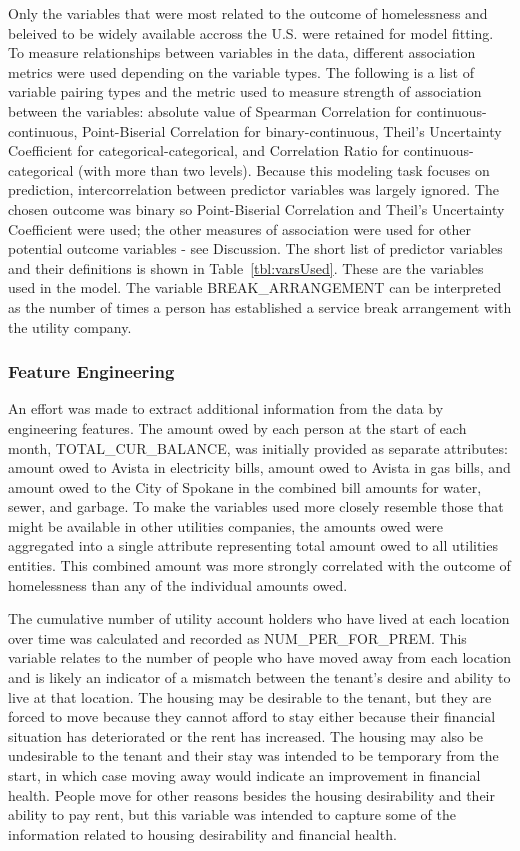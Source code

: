 \documentclass[10pt,letterpaper]{article}
\begin{document}
Only the variables that were most related to the outcome of homelessness and beleived to be widely available accross the U.S. were retained for model fitting. To measure relationships between variables in the data, different association metrics were used depending on the variable types. The following is a list of variable pairing types and the metric used to measure strength of association between the variables: absolute value of Spearman Correlation for continuous-continuous, Point-Biserial Correlation for binary-continuous, Theil's Uncertainty Coefficient for categorical-categorical, and Correlation Ratio for continuous-categorical (with more than two levels). Because this modeling task focuses on prediction, intercorrelation between predictor variables was largely ignored. The chosen outcome was binary so Point-Biserial Correlation and Theil's Uncertainty Coefficient were used; the other measures of association were used for other potential outcome variables - see Discussion. The short list of predictor variables and their definitions is shown in Table~\ref{tbl:varsUsed}. These are the variables used in the model. The variable BREAK\_ARRANGEMENT can be interpreted as the number of times a person has established a service break arrangement with the utility company.

\subsubsection*{Feature Engineering}
An effort was made to extract additional information from the data by engineering features. The amount owed by each person at the start of each month, TOTAL\_CUR\_BALANCE, was initially provided as separate attributes: amount owed to Avista in electricity bills, amount owed to Avista in gas bills, and amount owed to the City of Spokane in the combined bill amounts for water, sewer, and garbage. To make the variables used more closely resemble those that might be available in other utilities companies, the amounts owed were aggregated into a single attribute representing total amount owed to all utilities entities. This combined amount was more strongly correlated with the outcome of homelessness than any of the individual amounts owed.

The cumulative number of utility account holders who have lived at each location over time was calculated and recorded as NUM\_PER\_FOR\_PREM. This variable relates to the number of people who have moved away from each location and is likely an indicator of a mismatch between the tenant's desire and ability to live at that location. The housing may be desirable to the tenant, but they are forced to move because they cannot afford to stay either because their financial situation has deteriorated or the rent has increased. The housing may also be undesirable to the tenant and their stay was intended to be temporary from the start, in which case moving away would indicate an improvement in financial health. People move for other reasons besides the housing desirability and their ability to pay rent, but this variable was intended to capture some of the information related to housing desirability and financial health.
\end{document}

